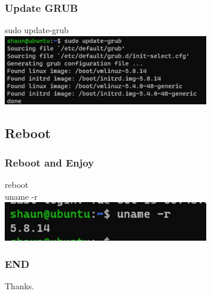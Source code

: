 \documentclass[aspectratio=169]{beamer}
\begin{document}
\begin{frame}
  \frametitle{Update GRUB}
  sudo update-grub\\
  \vspace{2cm}
  \includegraphics[width=9cm]{update-grub.jpg}
\end{frame}

\subsection{Reboot}

\begin{frame}
  \frametitle{Reboot and Enjoy}
  reboot\\
  uname -r\\
  \vspace{2cm}
  \includegraphics[width=9cm]{uname-new.jpg}
\end{frame}

\begin{frame}
  \frametitle{END}
  Thanks.
\end{frame}
\end{document}
